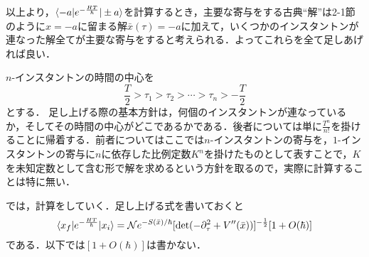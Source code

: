 \documentclass[a4paper,11pt]{jsarticle}
\begin{document}
以上より，$\braket{-a|e^{-\frac{HT}{\hbar}}|\pm a}$を計算するとき，主要な寄与をする古典``解''は2-1節のように$x=-a$に留まる解$\bar{x}(\tau)=-a$に加えて，いくつかのインスタントンが連なった解全てが主要な寄与をすると考えられる．よってこれらを全て足しあげれば良い．\par
$n$-インスタントンの時間の中心を
\begin{equation*}
\frac{T}{2} > \tau_1 > \tau_2 > \cdots > \tau_n > -\frac{T}{2}
\end{equation*}
とする．
足し上げる際の基本方針は，何個のインスタントンが連なっているか，そしてその時間の中心がどこであるかである．後者については単に$\frac{T^n}{n!}$を掛けることに帰着する．前者についてはここでは$n$-インスタントンの寄与を，$1$-インスタントンの寄与に$n$に依存した比例定数$K^n$を掛けたものとして表すことで，$K$を未知定数として含む形で解を求めるという方針を取るので，実際に計算することは特に無い．\par
では，計算をしていく．足し上げる式を書いておくと
\begin{equation*}
\braket{x_f|e^{-\frac{HT}{\hbar}}|x_i}=\mathcal{N}e^{-S(\bar{x})/\hbar}[\mathrm{det}(-\partial_\tau^2+V''(\bar{x}))]^{-\frac{1}{2}}[1+O(\hbar)]
\end{equation*}
である．以下では$[1+O(\hbar)]$は書かない．
\end{document}
